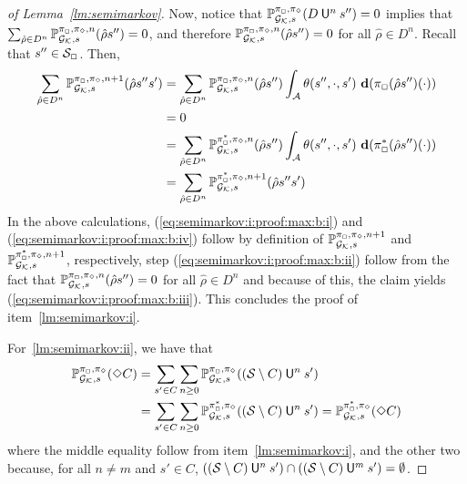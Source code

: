 \begin{proof}[of Lemma~\ref{lm:semimarkov}]
  Now, notice that
  $\mathbb{P}^{\pi_{{\Box}},\pi_{{\Diamond}}}_{{\mathcal{G}_{\mathcal{K}}},s}(D \mathbin{\mathsf{U}}^n s'') = 0$
  implies that
  $\sum_{\hat{\rho}\in D^n}\mathbb{P}^{\pi_{{\Box}},\pi_{{\Diamond}},n}_{{\mathcal{G}_{\mathcal{K}}},s}(\hat{\rho}s'') = 0$,
  and therefore
  $\mathbb{P}^{\pi_{{\Box}},\pi_{{\Diamond}},n}_{{\mathcal{G}_{\mathcal{K}}},s}(\hat{\rho}s'') = 0$
  for all $\hat{\rho}\in D^n$.
  Recall that $s''\in\mathcal{S}_{\Box}$. Then,
  \begin{align}
    \sum_{\hat{\rho} \in D^n} \Prob^{\strat_{\maxplay},\strat_{\minplay},n+1}_{\StochGK,s}(\hat{\rho}s''s') %
    & =
    \sum_{\hat{\rho} \in D^n} \Prob^{\strat_{\maxplay},\strat_{\minplay},n}_{\StochGK,s}(\hat{\rho}s'')\int_{\sgactions}\sgtrans(s'',\cdot,s')\ \diff(\strat_{\maxplay}(\hat{\rho}s'')(\cdot))
    \label{eq:semimarkov:i:proof:max:b:i}\\
    & =
    0
    \label{eq:semimarkov:i:proof:max:b:ii}\\
    & =
    \sum_{\hat{\rho} \in D^n} \Prob^{\starredstrat_{\maxplay},\strat_{\minplay},n}_{\StochGK,s}(\hat{\rho}s'')\int_{\sgactions}\sgtrans(s'',\cdot,s')\ \diff(\starredstrat_{\maxplay}(\hat{\rho}s'')(\cdot))
    \label{eq:semimarkov:i:proof:max:b:iii}\\
    & =
    \sum_{\hat{\rho} \in D^n} \Prob^{\starredstrat_{\maxplay},\strat_{\minplay},n+1}_{\StochGK,s}(\hat{\rho}s''s')
    \label{eq:semimarkov:i:proof:max:b:iv}
  \end{align}
  In the above calculations,
  (\ref{eq:semimarkov:i:proof:max:b:i}) and
  (\ref{eq:semimarkov:i:proof:max:b:iv}) follow by definition of
  $\mathbb{P}^{\pi_{{\Box}},\pi_{{\Diamond}},n+1}_{{\mathcal{G}_{\mathcal{K}}},s}$ and
  $\mathbb{P}^{\pi^*_{{\Box}},\pi_{{\Diamond}},n+1}_{{\mathcal{G}_{\mathcal{K}}},s}$, respectively,
  step (\ref{eq:semimarkov:i:proof:max:b:ii}) follow from the fact that
  $\mathbb{P}^{\pi_{{\Box}},\pi_{{\Diamond}},n}_{{\mathcal{G}_{\mathcal{K}}},s}(\hat{\rho}s'') = 0$
  for all $\hat{\rho}\in D^n$ and because of this, the claim yields
  (\ref{eq:semimarkov:i:proof:max:b:iii}).
  This concludes the proof of item~\ref{lm:semimarkov:i}.

  \medskip
  
  For~\ref{lm:semimarkov:ii}, we have that
  \begin{align*}
    \mathbb{P}^{\pi_{{\Box}},\pi_{{\Diamond}}}_{{\mathcal{G}_{\mathcal{K}}},s}(\Diamond C)
    & =
    \sum_{s'\in C}\sum_{n\geq0}\mathbb{P}^{\pi_{{\Box}},\pi_{{\Diamond}}}_{{\mathcal{G}_{\mathcal{K}}},s}((\mathcal{S}\setminus C) \mathbin{\mathsf{U}}^n s')
    \\
    & =
    \sum_{s'\in C}\sum_{n\geq0}\mathbb{P}^{\pi^*_{{\Box}},\pi_{{\Diamond}}}_{{\mathcal{G}_{\mathcal{K}}},s}((\mathcal{S}\setminus C) \mathbin{\mathsf{U}}^n s')
    =
    \mathbb{P}^{\pi^*_{{\Box}},\pi_{{\Diamond}}}_{{\mathcal{G}_{\mathcal{K}}},s}(\Diamond C)
  \end{align*}
  where the middle equality follow from item~\ref{lm:semimarkov:i},
  and the other two because, for all $n\neq m$ and $s'\in C$,
  $((\mathcal{S}\setminus C) \mathbin{\mathsf{U}}^n s') \cap ((\mathcal{S}\setminus C) \mathbin{\mathsf{U}}^m s') = \emptyset$.


\end{proof}
